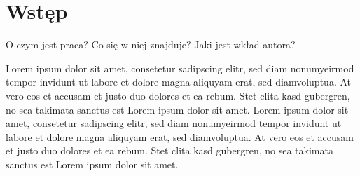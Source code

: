 \documentclass[a4paper,11pt,twoside]{report}
\theoremstyle{definition}
\begin{document}
\null\thispagestyle{empty}\newpage

%
%
%

\null\thispagestyle{empty}\newpage

%
%

%
%
\null\thispagestyle{empty}\newpage

\tableofcontents
\thispagestyle{empty}

\newpage %

\null\thispagestyle{empty}\newpage
\pagestyle{fancy}
\setcounter{page}{11} %

\chapter*{Wstęp}

O czym jest praca? Co się w niej znajduje? Jaki jest wkład autora?

Lorem ipsum dolor sit amet, consetetur sadipscing elitr, sed diam nonumyeirmod tempor invidunt ut labore et dolore magna aliquyam erat, sed diamvoluptua. At vero eos et accusam et justo duo dolores et ea rebum. Stet clita kasd gubergren, no sea takimata sanctus est Lorem ipsum dolor sit amet. Lorem ipsum dolor sit amet, consetetur sadipscing elitr, sed diam nonumyeirmod tempor invidunt ut labore et dolore magna aliquyam erat, sed diamvoluptua. At vero eos et accusam et justo duo dolores et ea rebum. Stet clita kasd gubergren, no sea takimata sanctus est Lorem ipsum dolor sit amet.
\end{document}
